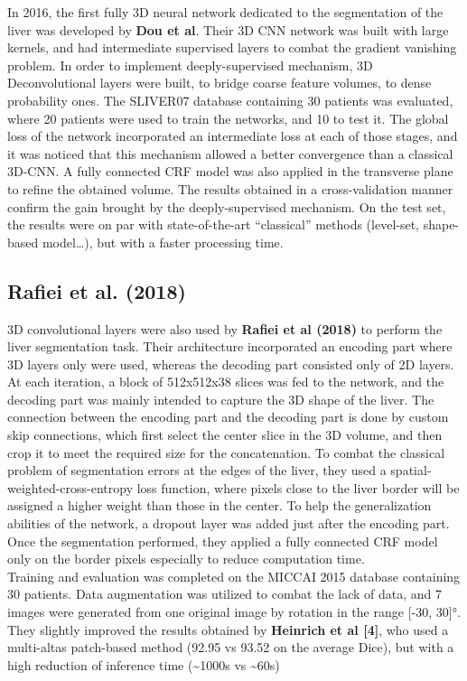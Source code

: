 In 2016, the first fully 3D neural network dedicated to the segmentation
of the liver was developed by \textbf{Dou et al}. Their 3D CNN network
was built with large kernels, and had intermediate supervised layers to
combat the gradient vanishing problem. In order to implement
deeply-supervised mechanism, 3D Deconvolutional layers were built, to
bridge coarse feature volumes, to dense probability ones. The SLIVER07
database containing 30 patients was evaluated, where 20 patients were
used to train the networks, and 10 to test it. The global loss of the
network incorporated an intermediate loss at each of those stages, and
it was noticed that this mechanism allowed a better convergence than a
classical 3D-CNN. A fully connected CRF model was also applied in the
transverse plane to refine the obtained volume. The results obtained in
a cross-validation manner confirm the gain brought by the
deeply-supervised mechanism. On the test set, the results were on par
with state-of-the-art ``classical'' methods (level-set, shape-based
model\ldots{}), but with a faster processing time.

\subsection*{Rafiei et al. (2018)}\label{rafiei-et-al.-2018}

3D convolutional layers were also used by \textbf{Rafiei et al (2018)}
to perform the liver segmentation task. Their architecture incorporated
an encoding part where 3D layers only were used, whereas the decoding
part consisted only of 2D layers. At each iteration, a block of
512x512x38 slices was fed to the network, and the decoding part was
mainly intended to capture the 3D shape of the liver. The connection
between the encoding part and the decoding part is done by custom skip
connections, which first select the center slice in the 3D volume, and
then crop it to meet the required size for the concatenation. To combat
the classical problem of segmentation errors at the edges of the liver,
they used a spatial-weighted-cross-entropy loss function, where pixels
close to the liver border will be assigned a higher weight than those in
the center. To help the generalization abilities of the network, a
dropout layer was added just after the encoding part. Once the
segmentation performed, they applied a fully connected CRF model only on
the border pixels especially to reduce computation time.\\
Training and evaluation was completed on the MICCAI 2015 database
containing 30 patients. Data augmentation was utilized to combat the
lack of data, and 7 images were generated from one original image by
rotation in the range {[}-30, 30{]}°.\\
They slightly improved the results obtained by \textbf{Heinrich et al
{[}4{]}}, who used a multi-altas patch-based method (92.95 vs 93.52 on
the average Dice), but with a high reduction of inference time
(\textasciitilde{}1000s vs \textasciitilde{}60s)

